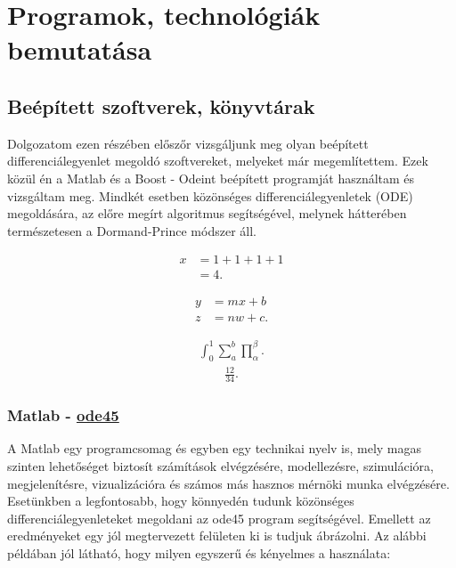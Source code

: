 \chapter{Programok, technológiák bemutatása} \label{fejezet3}

\section {Beépített szoftverek, könyvtárak}

Dolgozatom ezen részében előszőr vizsgáljunk meg olyan beépített differenciálegyenlet megoldó szoftvereket, melyeket már megemlítettem. Ezek közül én a Matlab és a Boost - Odeint beépített programját használtam és vizsgáltam meg. Mindkét esetben közönséges differenciálegyenletek (ODE) megoldására, az előre megírt algoritmus segítségével, melynek hátterében természetesen a Dormand-Prince módszer áll.


	\begin{align}
	x&=1+1+1+1\\
	&=4.
\end{align}

	\begin{align}
	y&=mx+b\nonumber\\
	z&=nw+c.
\end{align}

			\begin{align}
	\int_0^1\sum_a^b\prod_\alpha^\beta.
\end{align}
	\begin{align*}
	\frac{12}{34}.
\end{align*}
\subsection {Matlab - \href{https://www.mathworks.com/help/matlab/ref/ode45.html}{ode45}} \label{MatlabOde45}

A Matlab egy programcsomag és egyben egy technikai nyelv is, mely magas szinten lehetőséget biztosít számítások elvégzésére, modellezésre, szimulációra, megjelenítésre, vizualizációra és számos más hasznos mérnöki munka elvégzésére. Esetünkben a legfontosabb, hogy könnyedén tudunk közönséges differenciálegyenleteket megoldani az ode45 program segítségével. Emellett az eredményeket egy jól megtervezett felületen ki is tudjuk ábrázolni. Az alábbi példában jól látható, hogy milyen egyszerű és kényelmes a használata:

